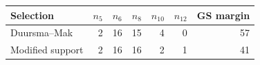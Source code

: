 \begin{tabular}{lrrrrrr}
\toprule
Selection & $n_5$ & $n_6$ & $n_8$ & $n_{10}$ & $n_{12}$ & GS margin\\
\midrule
Duursma--Mak &2&16&15&4&0&57\\
Modified support &2&16&16&2&1&41\\
\bottomrule
\end{tabular}
